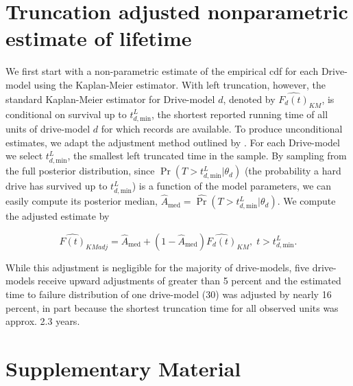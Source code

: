 \documentclass[12pt]{article}
\begin{document}
\clearpage

\appendix
\section{Truncation adjusted nonparametric estimate of lifetime}
\label{sec:trunc-adj}
We first start with a non-parametric estimate of the empirical cdf for each Drive-model using the Kaplan-Meier estimator.  With left truncation, however, the standard Kaplan-Meier estimator for Drive-model $d$, denoted by
$\widehat{F_d(t)}_{KM}$, is conditional on survival up to
$t_{d,\text{min}}^L$, the shortest reported running time of all units
of drive-model $d$ for which records are available. To produce
unconditional estimates, we adapt the adjustment method outlined by \citet[Chapter 11]{meeker}.  For each Drive-model we select
$t_{d,\text{min}}^L$, the smallest left truncated time in the sample.
By sampling from the full posterior distribution, since
$\Pr(T>t_{d,\text{min}}^L|\theta_d)$ (the probability a hard drive has
survived up to $t_{d,\text{min}}^L$) is a function of the model
parameters, we can easily compute its posterior median,
$\widehat{A}_{\text{med}} = \widehat{\Pr}(T>t_{d,\text{min}}^L|\theta_d)$. We compute the adjusted estimate by

$$\widehat{F(t)}_{KMadj} = \widehat{A}_{\text{med}} + \left(1 - \widehat{A}_{\text{med}}\right)\widehat{F_d(t)}_{KM},\; t>t_{d,\text{min}}^L.$$

While this adjustment is negligible for the majority of drive-models, five drive-models receive upward adjustments of greater than 5 percent and the estimated time to failure distribution of one drive-model (30) was adjusted by nearly 16 percent, in part because the shortest truncation time for all observed units was approx. 2.3 years.

\section{Supplementary Material}
\label{sec:supple}
\end{document}
